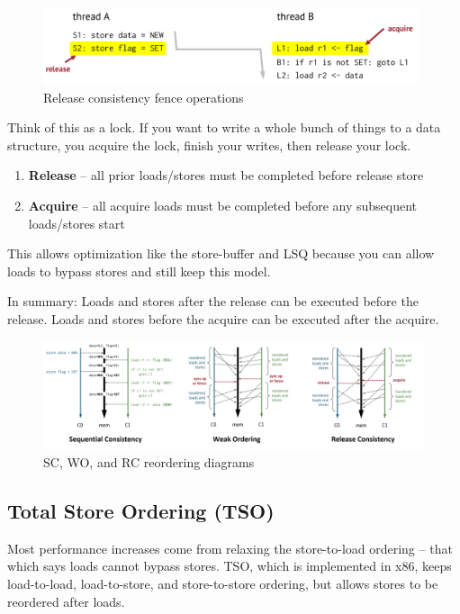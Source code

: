 \documentclass{article}
\begin{document}
 \begin{figure}[ht!]
\centering
\includegraphics[width=110mm]{img/release.png}
\caption{Release consistency fence operations}
\end{figure}
 
 Think of this as a lock. If you want to write a whole bunch of things to a data structure, you acquire the lock, finish your writes, then release your lock.
 
 \begin{enumerate}
 \item \textbf{Release} -- all prior loads/stores must be completed before release store
 
 \item \textbf{Acquire} -- all acquire loads must be completed before any subsequent loads/stores start
 \end{enumerate}
 
 This allows optimization like the store-buffer and LSQ because you can allow loads to bypass stores and still keep this model. 
 
 In summary: Loads and stores after the release can be executed before the release. Loads and stores before the acquire can be executed after the acquire. 

 
 \begin{figure}[ht!]
\centering
\includegraphics[width=120mm]{img/reorderingdiagrams.png}
\caption{SC, WO, and RC reordering diagrams}
\end{figure}
 
\subsection{Total Store Ordering (TSO)}

Most performance increases come from relaxing the store-to-load ordering -- that which says loads cannot bypass stores. TSO, which is implemented in x86, keeps load-to-load, load-to-store, and store-to-store ordering, but allows stores to be reordered after loads.
\end{document}

